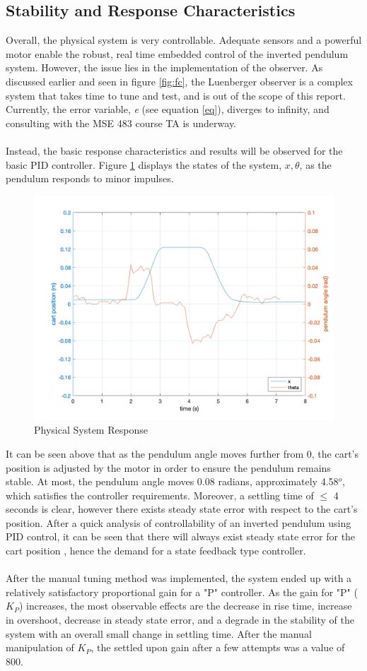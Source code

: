 \documentclass[12pt]{article}
\begin{document}
\subsection{Stability and Response Characteristics}
Overall, the physical system is very controllable. Adequate sensors and a powerful motor enable the robust, real time embedded control of the inverted pendulum system. However, the issue lies in the implementation of the observer. As discussed earlier and seen in figure \ref{fig:fc}, the Luenberger observer is a complex system that takes time to tune and test, and is out of the scope of this report. Currently, the error variable, \textit{e} (see equation \ref{eq}), diverges to infinity, and consulting with the MSE 483 course TA is underway.\\\\
Instead, the basic response characteristics and results will be observed for the basic PID controller. Figure \ref{fig:step} displays the states of the system, $x, \theta$, as the pendulum responds to minor impulses.
\begin{figure}[H]
    \centering
    \includegraphics[width=.7\linewidth]{figures/nice.png}
    \caption{Physical System Response}
    \label{fig:step}
\end{figure}
It can be seen above that as the pendulum angle moves further from 0, the cart's position is adjusted by the motor in order to ensure the pendulum remains stable. At most, the pendulum angle moves 0.08 radians, approximately 4.58$^o$, which satisfies the controller requirements. Moreover, a settling time of $\leq$ 4 seconds is clear, however there exists steady state error with respect to the cart's position. After a quick analysis of controllability of an inverted pendulum using PID control, it can be seen that there will always exist steady state error for the cart position \cite{pidBad}, hence the demand for a state feedback type controller.
\\\\
After the manual tuning method was implemented, the system ended up with a relatively satisfactory proportional gain for a "P" controller. As the gain for "P" ($K_P$) increases, the most observable effects are the decrease in rise time, increase in overshoot, decrease in steady state error, and a degrade in the stability of the system with an overall small change in settling time. After the manual manipulation of $K_P$, the settled upon gain after a few attempts was a value of $800$.  
\end{document}
